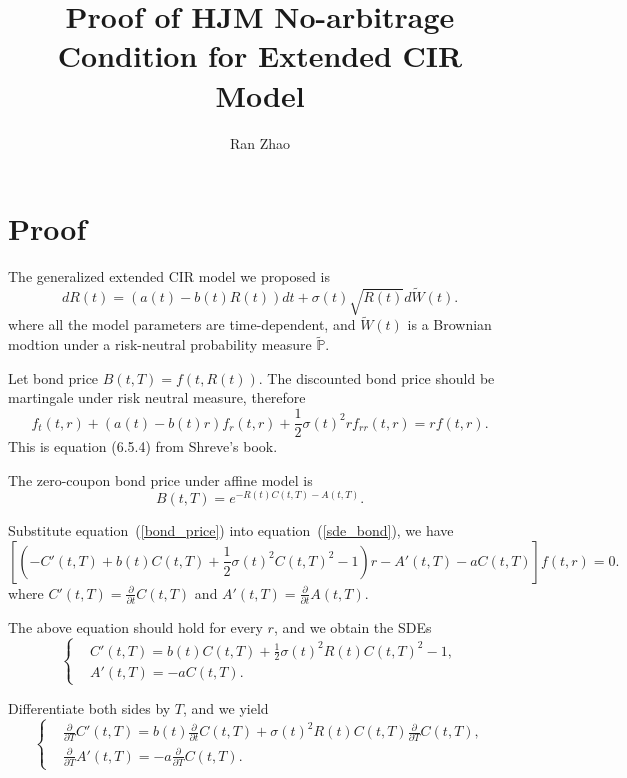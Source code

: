 \documentclass[6pt]{article}
\numberwithin{equation}{section}
\begin{document}
\title{Proof of HJM No-arbitrage Condition for Extended CIR Model}
\author{Ran Zhao}
\date{}
\maketitle



\section{Proof}
The generalized extended CIR model we proposed is
$$
d R(t) = (a(t) - b(t) R(t)) dt + \sigma(t) \sqrt{R(t)} d\tilde{W}(t).
$$
where all the model parameters are time-dependent, and $\tilde{W}(t)$ is a Brownian modtion under a risk-neutral probability measure $\tilde{\mathbb{P}}$.

Let bond price $B(t,T)=f(t,R(t))$. The discounted bond price should be martingale under risk neutral measure, therefore
\begin{equation} \label{sde_bond}
f_t(t,r) + (a(t)-b(t)r) f_r(t,r) + \frac{1}{2}\sigma(t)^2 r f_{rr}(t,r) = r f(t,r).
\end{equation}
This is equation (6.5.4) from Shreve's book.

The zero-coupon bond price under affine model is
\begin{equation} \label{bond_price}
B(t, T) = e^{-R(t)C(t,T) - A(t,T)}.
\end{equation}

Substitute equation~(\ref{bond_price}) into equation~(\ref{sde_bond}), we have
$$
[(-C'(t,T)+b(t)C(t,T) + \frac{1}{2}\sigma(t)^2 C(t,T)^2-1)r - A'(t,T)-aC(t,T)]f(t,r) = 0.
$$
where $C'(t,T)=\frac{\partial}{\partial t}C(t,T)$ and $A'(t,T)=\frac{\partial}{\partial t}A(t,T)$.

The above equation should hold for every $r$, and we obtain the SDEs
\begin{equation}
\label{CIR}
\left\{\begin{array}{ll}
&C'(t,T) = b(t)C(t,T) + \frac{1}{2}\sigma(t)^2 R(t) C(t,T)^2 - 1,  \\
&A'(t,T) = -a C(t,T).
\end{array}\right.
\end{equation}

Differentiate both sides by $T$, and we yield
\begin{equation}
\left\{\begin{array}{ll}
&\frac{\partial}{\partial T}C'(t,T) = b(t) \frac{\partial}{\partial t} C(t,T) + \sigma(t)^2 R(t) C(t,T)\frac{\partial}{\partial T}C(t,T),    \\
&\frac{\partial}{\partial T}A'(t,T) = -a \frac{\partial}{\partial T}C(t,T).
\end{array}\right.\label{CIR_pde}
\end{equation}
\end{document}
